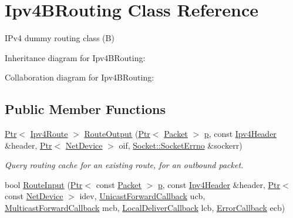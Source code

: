 \hypertarget{classIpv4BRouting}{}\section{Ipv4\+B\+Routing Class Reference}
\label{classIpv4BRouting}


I\+Pv4 dummy routing class (B)  




Inheritance diagram for Ipv4\+B\+Routing\+:


Collaboration diagram for Ipv4\+B\+Routing\+:
\subsection*{Public Member Functions}
\begin{DoxyCompactItemize}
\item 
\hyperlink{classns3_1_1Ptr}{Ptr}$<$ \hyperlink{classns3_1_1Ipv4Route}{Ipv4\+Route} $>$ \hyperlink{classIpv4BRouting_a69b78371109b582b4b99b1996843c9ed}{Route\+Output} (\hyperlink{classns3_1_1Ptr}{Ptr}$<$ \hyperlink{classns3_1_1Packet}{Packet} $>$ \hyperlink{lte__link__budget__x2__handover__measures_8m_ac9de518908a968428863f829398a4e62}{p}, const \hyperlink{classns3_1_1Ipv4Header}{Ipv4\+Header} \&header, \hyperlink{classns3_1_1Ptr}{Ptr}$<$ \hyperlink{classns3_1_1NetDevice}{Net\+Device} $>$ oif, \hyperlink{classns3_1_1Socket_ada1328c5ae0c28cb2a982caf8f6d6cca}{Socket\+::\+Socket\+Errno} \&sockerr)
\begin{DoxyCompactList}\small\item\em Query routing cache for an existing route, for an outbound packet. \end{DoxyCompactList}\item 
bool \hyperlink{classIpv4BRouting_af9523c1d16620315a75597d18ea03933}{Route\+Input} (\hyperlink{classns3_1_1Ptr}{Ptr}$<$ const \hyperlink{classns3_1_1Packet}{Packet} $>$ \hyperlink{lte__link__budget__x2__handover__measures_8m_ac9de518908a968428863f829398a4e62}{p}, const \hyperlink{classns3_1_1Ipv4Header}{Ipv4\+Header} \&header, \hyperlink{classns3_1_1Ptr}{Ptr}$<$ const \hyperlink{classns3_1_1NetDevice}{Net\+Device} $>$ idev, \hyperlink{classns3_1_1Ipv4RoutingProtocol_a3453a85764cbbb1e704da7e919aa5d19}{Unicast\+Forward\+Callback} ucb, \hyperlink{classns3_1_1Ipv4RoutingProtocol_a26e76f7a555462e6c08fceda64a99d58}{Multicast\+Forward\+Callback} mcb, \hyperlink{classns3_1_1Ipv4RoutingProtocol_aa6ffa0159cb143daa3c46d2ba69bb1b9}{Local\+Deliver\+Callback} lcb, \hyperlink{classns3_1_1Ipv4RoutingProtocol_a0348285418c30d5021b08f7a68af21ea}{Error\+Callback} ecb)

\end{DoxyCompactItemize}
